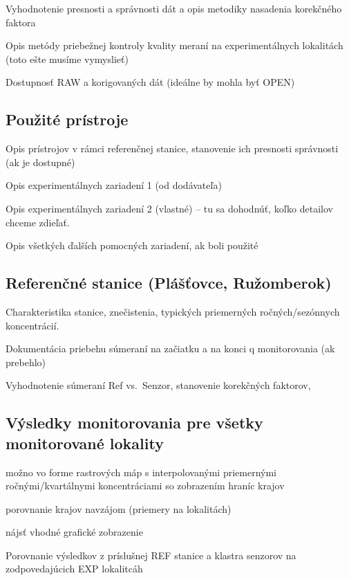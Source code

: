 \documentclass[
  slovak,
  letterpaper,
  DIV=11,
  numbers=noendperiod]{scrartcl}
\begin{document}
Vyhodnotenie presnosti a správnosti dát a opis metodiky nasadenia
korekčného faktora

Opis metódy priebežnej kontroly kvality meraní na experimentálnych
lokalitách (toto ešte musíme vymyslieť)

Dostupnosť RAW a korigovaných dát (ideálne by mohla byť OPEN)

\subsection{Použité prístroje}\label{pouux17eituxe9-pruxedstroje}

Opis prístrojov v rámci referenčnej stanice, stanovenie ich presnosti
správnosti (ak je dostupné)

Opis experimentálnych zariadení 1 (od dodávateľa)

Opis experimentálnych zariadení 2 (vlastné) -- tu sa dohodnúť, koľko
detailov chceme zdieľať.

Opis všetkých ďalších pomocných zariadení, ak boli použité

\subsection{Referenčné stanice (Plášťovce,
Ružomberok)}\label{referenux10dnuxe9-stanice-pluxe1ux161ux165ovce-ruux17eomberok}

Charakteristika stanice, znečistenia, typických priemerných
ročných/sezónnych koncentrácií.

Dokumentácia priebehu súmeraní na začiatku a na konci q monitorovania
(ak prebehlo)

Vyhodnotenie súmeraní Ref vs.~Senzor, stanovenie korekčných faktorov,

\subsection{Výsledky monitorovania pre všetky monitorované
lokality}\label{vuxfdsledky-monitorovania-pre-vux161etky-monitorovanuxe9-lokality}

možno vo forme rastrových máp s interpolovanými priemernými
ročnými/kvartálnymi koncentráciami so zobrazením hraníc krajov

porovnanie krajov navzájom (priemery na lokalitách)

nájsť vhodné grafické zobrazenie

Porovnanie výsledkov z príslušnej REF stanice a klastra senzorov na
zodpovedajúcich EXP lokalitcáh
\end{document}
